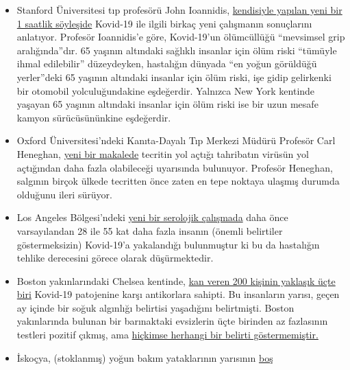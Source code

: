 \begin{itemize}
\tightlist
\item
  Stanford Üniversitesi tıp profesörü John Ioannidis,
  \href{https://www.youtube.com/watch?v=cwPqmLoZA4s}{kendisiyle yapılan
  yeni bir 1 saatlik söyleşide} Kovid-19 ile ilgili birkaç yeni
  çalışmanın sonuçlarını anlatıyor. Profesör Ioannidis'e göre,
  Kovid-19'un ölümcüllüğü ``mevsimsel grip aralığında''dır. 65 yaşının
  altındaki sağlıklı insanlar için ölüm riski ``tümüyle ihmal
  edilebilir'' düzeydeyken, hastalığın dünyada ``en yoğun görüldüğü
  yerler''deki 65 yaşının altındaki insanlar için ölüm riski, işe gidip
  gelirkenki bir otomobil yolculuğundakine eşdeğerdir. Yalnızca New York
  kentinde yaşayan 65 yaşının altındaki insanlar için ölüm riski ise bir
  uzun mesafe kamyon sürücüsününkine eşdeğerdir.
\item
  Oxford Üniversitesi'ndeki Kanıta-Dayalı Tıp Merkezi Müdürü Profesör
  Carl Heneghan,
  \href{https://news.yahoo.com/lockdown-damage-outweighs-coronavirus-warning-121940675.html}{yeni
  bir makalede} tecritin yol açtığı tahribatın virüsün yol açtığından
  daha fazla olabileceği uyarısında bulunuyor. Profesör Heneghan,
  salgının birçok ülkede tecritten önce zaten en tepe noktaya ulaşmış
  durumda olduğunu ileri sürüyor.
\item
  Los Angeles Bölgesi'ndeki
  \href{http://publichealth.lacounty.gov/phcommon/public/media/mediapubhpdetail.cfm?prid=2328}{yeni
  bir serolojik çalışmada} daha önce varsayılandan 28 ile 55 kat daha
  fazla insanın (önemli belirtiler göstermeksizin) Kovid-19'a
  yakalandığı bulunmuştur ki bu da hastalığın tehlike derecesini görece
  olarak düşürmektedir.
\item
  Boston yakınlarındaki Chelsea kentinde,
  \href{https://archive.is/20200418222442/https://www.bostonglobe.com/2020/04/17/business/nearly-third-200-blood-samples-taken-chelsea-show-exposure-coronavirus/}{kan
  veren 200 kişinin yaklaşık üçte biri} Kovid-19 patojenine karşı
  antikorlara sahipti. Bu insanların yarısı, geçen ay içinde bir soğuk
  algınlığı belirtisi yaşadığını belirtmişti. Boston yakınlarında
  bulunan bir barınaktaki evsizlerin üçte birinden az fazlasının
  testleri pozitif çıkmış, ama
  \href{https://www.wsbtv.com/news/trending/coronavirus-cdc-reviewing-stunning-universal-testing-results-boston-homeless-shelter/ZADQ45HCAZEVJAZA3OTCUR7M6M/}{hiçkimse
  herhangi bir belirti göstermemiştir.}
\item
  İskoçya, (stoklanmış) yoğun bakım yataklarının yarısının
  \href{https://www.heraldscotland.com/news/18377095.coronavirus-scotland-half-icu-beds-empty/}{boş
}
\end{itemize}
